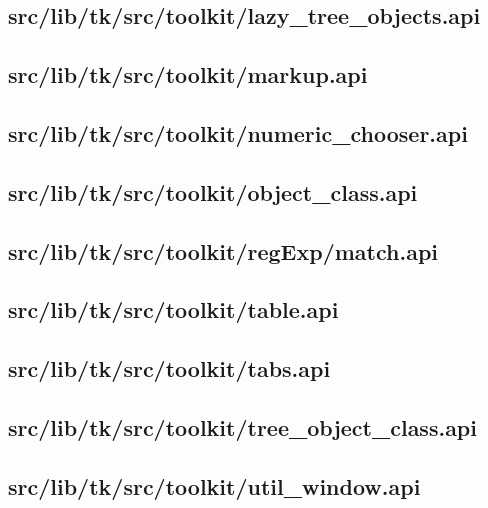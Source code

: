 \subsection{src/lib/tk/src/toolkit/lazy\_tree\_objects.api}


\subsection{src/lib/tk/src/toolkit/markup.api}


\subsection{src/lib/tk/src/toolkit/numeric\_chooser.api}


\subsection{src/lib/tk/src/toolkit/object\_class.api}


\subsection{src/lib/tk/src/toolkit/regExp/match.api}


\subsection{src/lib/tk/src/toolkit/table.api}


\subsection{src/lib/tk/src/toolkit/tabs.api}


\subsection{src/lib/tk/src/toolkit/tree\_object\_class.api}


\subsection{src/lib/tk/src/toolkit/util\_window.api}


